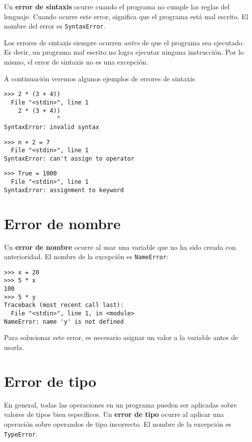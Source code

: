 Un \textbf{error de sintaxis} ocurre cuando el programa no cumple las
reglas del lenguaje. Cuando ocurre este error, significa que el programa
está mal escrito. El nombre del error es \lstinline!SyntaxError!.

Los errores de sintaxis siempre ocurren \emph{antes} de que el programa
sea ejecutado. Es decir, un programa mal escrito no logra ejecutar
ninguna instrucción. Por lo mismo, el error de sintaxis no es una
excepción.

A continuación veremos algunos ejemplos de errores de sintaxis

\begin{lstlisting}[language={}]
>>> 2 * (3 + 4))
  File "<stdin>", line 1
    2 * (3 + 4))
               ^
SyntaxError: invalid syntax
\end{lstlisting}

\begin{lstlisting}[language={}]
>>> n + 2 = 7
  File "<stdin>", line 1
SyntaxError: can't assign to operator
\end{lstlisting}

\begin{lstlisting}[language={}]
>>> True = 1000
  File "<stdin>", line 1
SyntaxError: assignment to keyword
\end{lstlisting}

\section{Error de nombre}

Un \textbf{error de nombre} ocurre al usar una variable que no ha sido
creada con anterioridad.
El nombre de la excepción es \lstinline!NameError!:
\begin{lstlisting}[language={}]
>>> x = 20
>>> 5 * x
100
>>> 5 * y
Traceback (most recent call last):
  File "<stdin>", line 1, in <module>
NameError: name 'y' is not defined
\end{lstlisting}

Para solucionar este error, es necesario asignar un valor a la variable
antes de usarla.

\section{Error de tipo}

En general, todas las operaciones en un programa pueden ser aplicadas
sobre valores de tipos bien específicos. Un \textbf{error de tipo}
ocurre al aplicar una operación sobre operandos de tipo incorrecto.
El nombre de la excepción es \lstinline!TypeError!.

